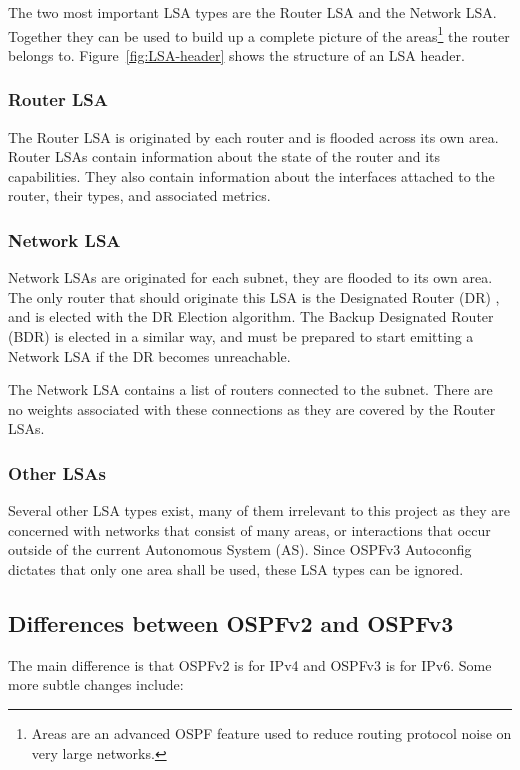\documentclass[12pt,a4paper,twoside]{report}
\begin{document}
The two most important LSA types are the Router LSA and the Network LSA\@.
Together they can be used to build up a complete picture of the
areas\footnote{Areas are an advanced OSPF feature used to reduce routing
protocol noise on very large networks.} the router belongs to.
Figure~\ref{fig:LSA-header} shows the structure of an LSA header. 

\subsubsection{Router LSA}
The Router LSA is originated by each router and is flooded across its own area.
Router LSAs contain information about the state of the router and its
capabilities. They also contain information about the interfaces attached to
the router, their types, and associated metrics.

\subsubsection{Network LSA}
Network LSAs are originated for each subnet, they are flooded to its own
area.  The only router that should originate this LSA is the Designated Router
(DR) , and is elected with the DR Election
algorithm. The Backup Designated Router (BDR)  is elected in a similar way, and must be prepared to start
emitting a Network LSA if the DR becomes unreachable. 

The Network LSA contains a list of routers connected to the subnet. There are no
weights associated with these connections as they are covered by the Router
LSAs. 

\subsubsection{Other LSAs}
Several other LSA types exist, many of them irrelevant to this project as they
are concerned with networks that consist of many areas, or interactions that
occur outside of the current Autonomous System (AS). Since OSPFv3 Autoconfig
dictates that only one area shall be used, these LSA types can be ignored.   

\subsection{Differences between OSPFv2 and OSPFv3}
The main difference is that OSPFv2 is for IPv4 and OSPFv3 is for IPv6. Some
more subtle changes include:
\end{document}
